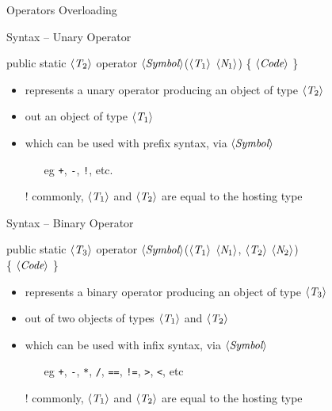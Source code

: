 \documentclass[presentation]{beamer}
\newcommand{\cscat}[1]{$\langle\text{{\itshape#1}}\rangle$}
\begin{document}
\begin{frame}[allowframebreaks]{Operators Overloading}
  \begin{block}{Syntax -- Unary Operator}
    \begin{center}\ttfamily
      public static \cscat{T$_2$} \alert{operator} \cscat{Symbol}\alert{(}\cscat{T$_1$} \cscat{N$_1$}\alert{)} \{ \cscat{Code} \}
    \end{center}
    \begin{itemize}
      \item represents a unary operator producing an object of type \texttt{\cscat{T$_2$}} 
      \item out an object of type \texttt{\cscat{T$_1$}}
      \item which can be used with prefix syntax, via \texttt{\cscat{Symbol}}
      \begin{itemize}
        \item[eg] \texttt{+}, \texttt{-}, \texttt{!}, etc.
      \end{itemize}
      \item[!] commonly, \texttt{\cscat{T$_1$}} and \texttt{\cscat{T$_2$}} are equal to the hosting type
    \end{itemize}
  \end{block}

  \begin{block}{Syntax -- Binary Operator}
    \begin{center}\ttfamily
      public static \cscat{T$_3$} \alert{operator} \cscat{Symbol}\alert{(}\cscat{T$_1$} \cscat{N$_1$}\alert{,} \cscat{T$_2$} \cscat{N$_2$}\alert{)} \\ \{ \cscat{Code} \}
    \end{center}
    \begin{itemize}
      \item represents a binary operator producing an object of type \texttt{\cscat{T$_3$}} 
      \item out of two objects of types \texttt{\cscat{T$_1$}} and \texttt{\cscat{T$_2$}}
      \item which can be used with infix syntax, via \texttt{\cscat{Symbol}}
      \begin{itemize}
        \item[eg] \texttt{+}, \texttt{-}, \texttt{*}, \texttt{/}, \texttt{==}, \texttt{!=}, \texttt{>}, \texttt{<}, etc
      \end{itemize}
      \item[!] commonly, \texttt{\cscat{T$_1$}} and \texttt{\cscat{T$_2$}} are equal to the hosting type
    \end{itemize}
  \end{block}


\end{frame}
\end{document}
